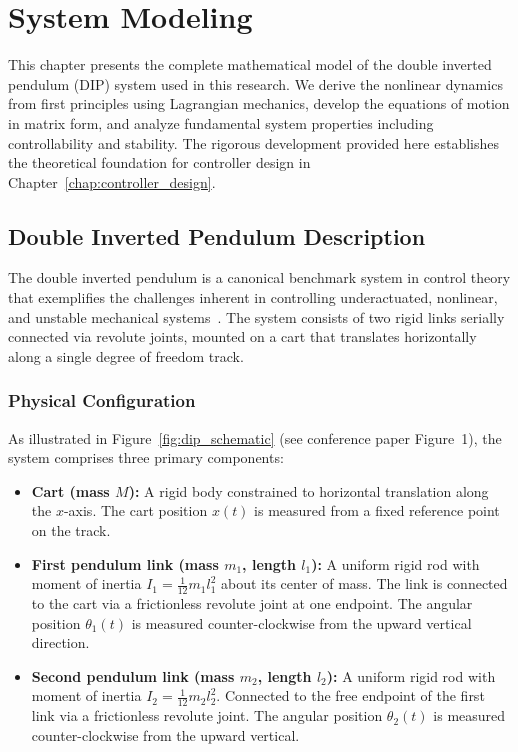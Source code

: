 \chapter{System Modeling}
\label{chap:system_modeling}

This chapter presents the complete mathematical model of the double inverted pendulum (DIP) system used in this research. We derive the nonlinear dynamics from first principles using Lagrangian mechanics, develop the equations of motion in matrix form, and analyze fundamental system properties including controllability and stability. The rigorous development provided here establishes the theoretical foundation for controller design in Chapter~\ref{chap:controller_design}.

\section{Double Inverted Pendulum Description}
\label{sec:dip_description}

The double inverted pendulum is a canonical benchmark system in control theory that exemplifies the challenges inherent in controlling underactuated, nonlinear, and unstable mechanical systems~\cite{spong1995energy, fantoni2001non}. The system consists of two rigid links serially connected via revolute joints, mounted on a cart that translates horizontally along a single degree of freedom track.

\subsection{Physical Configuration}

As illustrated in Figure~\ref{fig:dip_schematic} (see conference paper Figure~1), the system comprises three primary components:

\begin{itemize}
\item \textbf{Cart (mass $M$):} A rigid body constrained to horizontal translation along the $x$-axis. The cart position $x(t)$ is measured from a fixed reference point on the track.

\item \textbf{First pendulum link (mass $m_1$, length $l_1$):} A uniform rigid rod with moment of inertia $I_1 = \frac{1}{12}m_1 l_1^2$ about its center of mass. The link is connected to the cart via a frictionless revolute joint at one endpoint. The angular position $\theta_1(t)$ is measured counter-clockwise from the upward vertical direction.

\item \textbf{Second pendulum link (mass $m_2$, length $l_2$):} A uniform rigid rod with moment of inertia $I_2 = \frac{1}{12}m_2 l_2^2$. Connected to the free endpoint of the first link via a frictionless revolute joint. The angular position $\theta_2(t)$ is measured counter-clockwise from the upward vertical.
\end{itemize}

